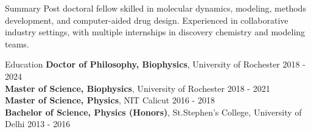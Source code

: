 \documentclass{resume} %
\begin{document}

\begin{rSection}{Summary}
   Post doctoral fellow skilled in molecular dynamics, modeling, methods development, and computer-aided drug design. Experienced in collaborative industry settings, with multiple internships in discovery chemistry and modeling teams.
\end{rSection}


\begin{rSection}{Education}
   {\bf Doctor of Philosophy, Biophysics}, University of Rochester  \hfill {2018 - 2024}\\
   {\bf Master of Science, Biophysics}, University of Rochester \hfill {2018 - 2021}\\
   {\bf Master of Science, Physics}, NIT Calicut \hfill {2016 - 2018}\\
   {\bf Bachelor of Science, Physics (Honors)}, St.Stephen's College, University of Delhi \hfill {2013 - 2016}

\end{rSection}

\end{document}
